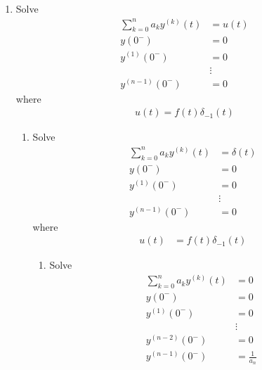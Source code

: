 \documentclass[fleqn, a4paper, 12pt, twoside]{article}
\theoremstyle{definition}
\theoremstyle{theorem}
\begin{document}
\begin{enumerate}
	\color{red}
	\item
		Solve
		\begin{align*}
			\sum\limits_{k = 0}^{n} a_k y^{(k)}(t) & = u(t) \\
			y(0^-)                                 & = 0    \\
			y^{(1)}(0^-)                           & = 0    \\
                                                               & \vdots \\
			y^{(n - 1)}(0^-)                       & = 0
		\end{align*}
		where
		\begin{align*}
			u(t) = f(t) \delta_{-1}(t)
		\end{align*}
		\begin{enumerate}
			\color{blue}
			\item
				Solve
				\begin{align*}
					\sum\limits_{k = 0}^{n} a_k y^{(k)}(t) & = \delta(t) \\
					y(0^-)                                 & = 0         \\
					y^{(1)}(0^-)                           & = 0         \\
                                                                               & \vdots      \\
					y^{(n - 1)}(0^-)                       & = 0
				\end{align*}
				where
				\begin{align*}
					u(t) & = f(t) \delta_{-1}(t)
				\end{align*}
				\begin{enumerate}
					\color{green}
					\item
						Solve
						\begin{align*}
							\sum\limits_{k = 0}^{n} a_k y^{(k)}(t) & = 0    \\
							y(0^-)                                 & = 0    \\
							y^{(1)}(0^-)                           & = 0    \\
                                                                                               & \vdots \\
							y^{(n - 2)}(0^-)                       & = 0    \\
							y^{(n - 1)}(0^-)                       & = \frac{1}{a_n}
						\end{align*}

\end{enumerate}
\end{enumerate}
\end{enumerate}
\end{document}
